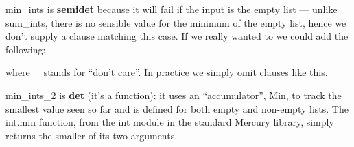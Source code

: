 \documentclass[a4paper,11pt,notitlepage,onecolumn]{book}
\begin{document}
\begin{small}

\begin{ptabular}
\nextline
\nextline
{}
\nextline
{}
\nextline
\nextline
{}
\nextline
\nextline
{}
\nextline
{}
\nextline
\nextline
{}
\nextline
\end{ptabular}

\end{small}
\textsf{min\_ints} is \textsf{\textbf{semidet}} because it will fail if the input is the empty list
--- unlike \textsf{sum\_ints}, there is no sensible value for the minimum of the
empty list, hence we don't supply a clause matching this case.
If we really wanted to we could add the following:
\begin{small}

\begin{ptabular}
\nextline
{}
\nextline
\end{ptabular}

\end{small}
where \textsf{\_} stands for ``don't care''.
In practice we simply omit clauses like this.

\textsf{min\_ints\_2} is \textsf{\textbf{det}} (it's a function): it uses an ``accumulator'',
\textsf{Min}, to track the smallest value seen so far and is defined for both empty
and non-empty lists.
The \textsf{int.min} function, from the \textsf{int} module in the
standard Mercury library, simply returns the smaller of its two arguments.
\end{document}
